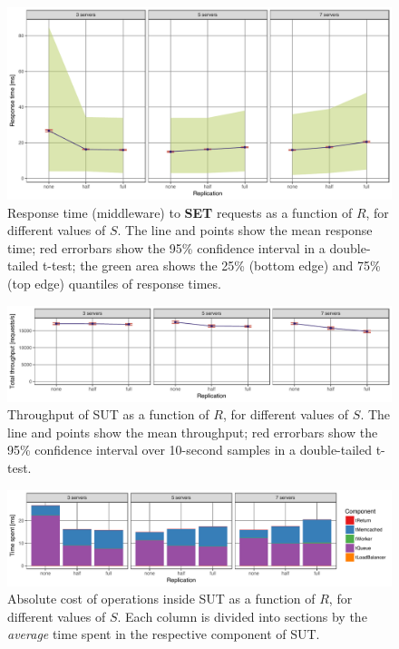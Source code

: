 \documentclass[11pt]{article}
\begin{document}
\begin{figure}[h]
\centering
\includegraphics[width=\textwidth]{../results/replication/graphs/response_time_vs_replication_set.pdf}
\caption{Response time (middleware) to \textbf{SET} requests as a function of $R$, for different values of $S$. The line and points show the mean response time; red errorbars show the 95\% confidence interval in a double-tailed t-test; the green area shows the 25\% (bottom edge) and 75\% (top edge) quantiles of response times.}
\label{fig:exp2:res:replication:set}
\end{figure}

\begin{figure}[h]
\centering
\includegraphics[width=\textwidth]{../results/replication/graphs/tp_vs_replication_all.pdf}
\caption{Throughput of SUT as a function of $R$, for different values of $S$. The line and points show the mean throughput; red errorbars show the 95\% confidence interval over 10-second samples in a double-tailed t-test.}
\label{fig:exp2:res:throughput}
\end{figure}

\begin{figure}[h]
\centering
\includegraphics[width=\textwidth]{../results/replication/graphs/time_breakdown_vs_replication_set_abs.pdf}
\caption{Absolute cost of operations inside SUT as a function of $R$, for different values of $S$. Each column is divided into sections by the \emph{average} time spent in the respective component of SUT.}
\label{fig:exp2:res:breakdown}
\end{figure}
\end{document}
